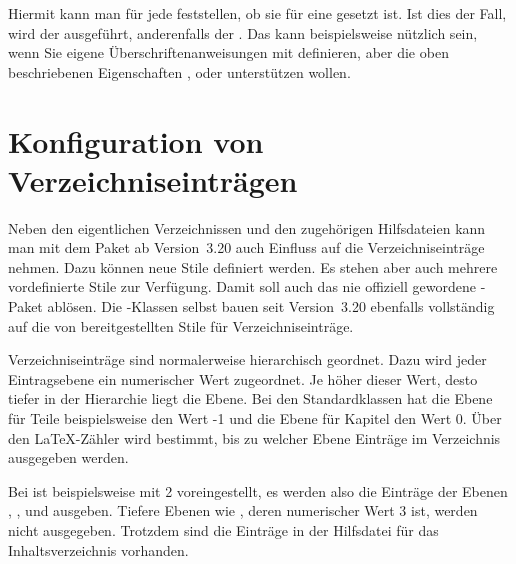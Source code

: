 \begin{Declaration}
\end{Declaration}
Hiermit kann man für jede
 feststellen, ob sie für eine 
gesetzt ist. Ist dies der Fall, wird der  ausgeführt,
anderenfalls der . Das kann beispielsweise nützlich sein,
wenn Sie eigene Überschriftenanweisungen mit
 definieren, aber die oben beschriebenen
Eigenschaften ,  oder 
unterstützen wollen.
%
\EndIndexGroup


\section{Konfiguration von Verzeichniseinträgen}
\BeginIndexGroup
{}

Neben den eigentlichen
Verzeichnissen und den zugehörigen Hilfsdateien kann man mit dem Paket
 ab Version~3.20 auch Einfluss auf die Verzeichniseinträge
nehmen. Dazu können neue Stile definiert werden. Es stehen aber auch mehrere
vordefinierte Stile zur Verfügung. Damit soll  auch das
nie offiziell gewordene \KOMAScript-Paket  ablösen. Die
\KOMAScript-Klassen selbst bauen seit Version~3.20 ebenfalls vollständig auf
die von  bereitgestellten Stile für Verzeichniseinträge.

\begin{Declaration}
\end{Declaration}
Verzeichniseinträge sind normalerweise hierarchisch geordnet. Dazu wird jeder
Eintragsebene ein numerischer Wert zugeordnet. Je höher dieser Wert, desto
tiefer in der Hierarchie liegt die Ebene. Bei den Standardklassen hat die
Ebene für Teile beispielsweise den Wert -1 und die Ebene für Kapitel den Wert
0. Über den \LaTeX-Zähler  wird bestimmt, bis zu welcher
Ebene Einträge im Verzeichnis ausgegeben werden. 

Bei  ist  beispielsweise mit 2 voreingestellt,
es werden also die Einträge der Ebenen , ,
 und  ausgeben. Tiefere Ebenen wie
, deren numerischer Wert 3 ist, werden nicht
ausgegeben. Trotzdem sind die Einträge in der Hilfsdatei für das
Inhaltsverzeichnis vorhanden.

